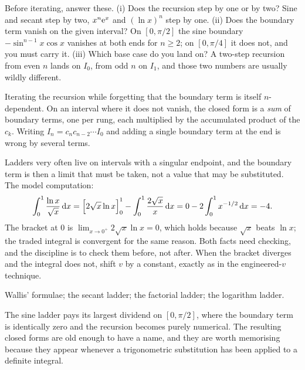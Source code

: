 \begin{keynote}
Before iterating, answer these. (i) Does the recursion step by one or by two? Sine and secant step by two, $x^{n}\mathrm{e}^{x}$ and $(\ln x)^{n}$ step by one. (ii) Does the boundary term vanish on the given interval? On $[0,\pi/2]$ the sine boundary $-\sin^{n-1}x\cos x$ vanishes at both ends for $n\geq2$; on $[0,\pi/4]$ it does not, and you must carry it. (iii) Which base case do you land on? A two-step recursion from even $n$ lands on $I_0$, from odd $n$ on $I_1$, and those two numbers are usually wildly different.
\end{keynote}

\begin{trap}
Iterating the recursion while forgetting that the boundary term is itself $n$-dependent. On an interval where it does not vanish, the closed form is a \emph{sum} of boundary terms, one per rung, each multiplied by the accumulated product of the $c_k$. Writing $I_n=c_nc_{n-2}\cdots I_{0}$ and adding a single boundary term at the end is wrong by several terms.
\end{trap}

\begin{keynote}
Ladders very often live on intervals with a singular endpoint, and the boundary term is then a limit that must be taken, not a value that may be substituted. The model computation:
\[\int_0^1\frac{\ln x}{\sqrt x}\,\mathrm{d} x=\Bigl[2\sqrt x\ln x\Bigr]_0^1-\int_0^1\frac{2\sqrt x}{x}\,\mathrm{d} x=0-2\int_0^1x^{-1/2}\,\mathrm{d} x=-4.\]
The bracket at $0$ is $\lim_{x\to0^+}2\sqrt x\ln x=0$, which holds because $\sqrt x$ beats $\ln x$; the traded integral is convergent for the same reason. Both facts need checking, and the discipline is to check them before, not after. When the bracket diverges and the integral does not, shift $v$ by a constant, exactly as in the engineered-$v$ technique.
\end{keynote}

\begin{seealsob}Wallis' formulae; the secant ladder; the factorial ladder; the logarithm ladder.\end{seealsob}

The sine ladder pays its largest dividend on $[0,\pi/2]$, where the boundary term is identically zero and the recursion becomes purely numerical. The resulting closed forms are old enough to have a name, and they are worth memorising because they appear whenever a trigonometric substitution has been applied to a definite integral.

